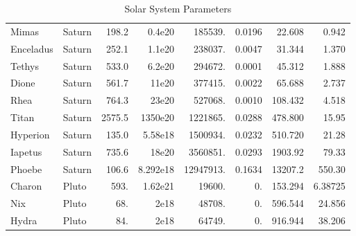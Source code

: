 \documentclass[11pt]{article}
\begin{document}
\begin{table}
\begin{tabular}{llrrrrrr}
Mimas     & Saturn & 198.2   & 0.4e20      & 185539.   & 0.0196  & 22.608  & 0.942 \\
Enceladus & Saturn & 252.1   & 1.1e20      & 238037.   & 0.0047  & 31.344  & 1.370 \\
Tethys    & Saturn & 533.0   & 6.2e20      & 294672.   & 0.0001  & 45.312  & 1.888 \\
Dione     & Saturn & 561.7   & 11e20       & 377415.   & 0.0022  & 65.688  & 2.737 \\
Rhea      & Saturn & 764.3   & 23e20       & 527068.   & 0.0010  & 108.432 & 4.518 \\
Titan     & Saturn & 2575.5  & 1350e20     & 1221865.  & 0.0288  & 478.800 & 15.95 \\
Hyperion  & Saturn & 135.0   & 5.58e18     & 1500934.  & 0.0232  & 510.720 & 21.28 \\
Iapetus   & Saturn & 735.6   & 18e20       & 3560851.  & 0.0293  & 1903.92 & 79.33 \\
Phoebe    & Saturn & 106.6   & 8.292e18    & 12947913. & 0.1634  & 13207.2 & 550.30 \\

Charon    & Pluto  & 593.    & 1.62e21     & 19600.    & 0.      & 153.294 & 6.38725 \\
Nix       & Pluto  & 68.     & 2e18        & 48708.    & 0.      & 596.544 & 24.856 \\
Hydra     & Pluto  & 84.     & 2e18        & 64749.    & 0.      & 916.944 & 38.206 \\
\end{tabular}
\caption{Solar System Parameters}
\label{table:systemvalues}
\end{table}
\end{document}
